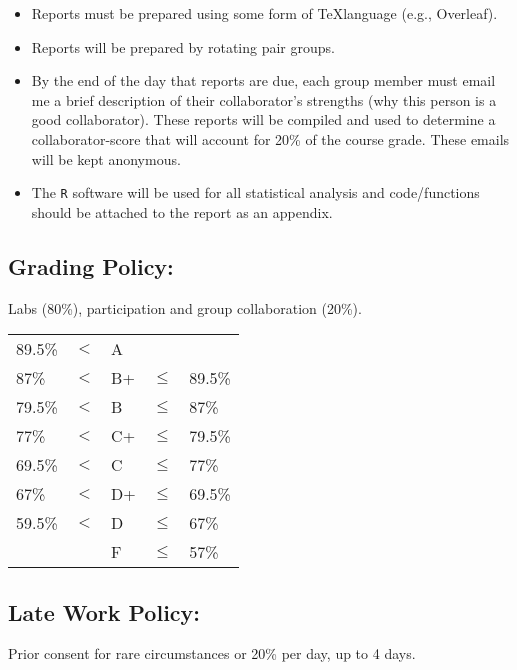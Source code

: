 \documentclass[11pt, a4paper]{article}
\begin{document}
\begin{itemize}
\item Reports must be prepared using some form of \TeX language (e.g., Overleaf).
\item Reports will be prepared by rotating pair groups.
\item By the end of the day that reports are due, each group member
  must email me a brief description of their collaborator's strengths
  (why this person is a good collaborator). These reports will be
  compiled and used to determine a collaborator-score that will
  account for 20\% of the course grade. These emails will be kept
  anonymous.
\item The \texttt{R} software will be used for all statistical
  analysis and code/functions should be attached to the report as an
  appendix.
\end{itemize}

\subsection*{Grading Policy:} Labs (80\%),
participation and group collaboration (20\%).

\begin{center}
  \begin{tabular}{ lllll }
    89.5\% & $<$ & A  &      &\\ 
    87\%   & $<$ & B+ &$\leq$& 89.5\%\\ 
    79.5\% & $<$ & B  &$\leq$& 87\%\\ 
    77\%   & $<$ & C+ &$\leq$& 79.5\%\\ 
    69.5\% & $<$ & C  &$\leq$& 77\%\\ 
    67\%   & $<$ & D+ &$\leq$& 69.5\%\\ 
    59.5\% & $<$ & D  &$\leq$& 67\%\\
           &     & F  &$\leq$& 57\%\\
  \end{tabular}
\end{center}

\subsection*{Late  Work Policy:}
Prior consent for rare circumstances or 20\% per day, up to 4 days. 
\end{document}
